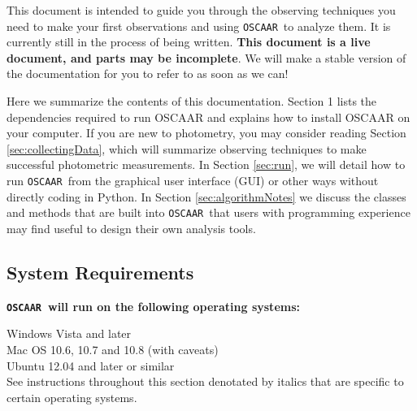 \documentclass[a4paper]{article}
\newcommand{\code}[1]{\texttt{#1}}
\newcommand{\oscaar}{\code{OSCAAR}~}
\begin{document}
This document is intended to guide you through the observing techniques you need to make your first observations and using \oscaar to analyze them. It is currently still in the process of being written. {\bf This document is a live document, and parts may be incomplete}. We will make a stable version of the documentation for you to refer to as soon as we can!

Here we summarize the contents of this documentation. Section 1 lists the dependencies required to run OSCAAR and explains how to install OSCAAR on your computer. If you are new to photometry, you may consider reading Section \ref{sec:collectingData}, which will summarize observing techniques to make successful photometric measurements. In Section \ref{sec:run}, we will detail how to run \oscaar from the graphical user interface (GUI) or other ways without directly coding in Python. In Section \ref{sec:algorithmNotes} we discuss the classes and methods that are built into \oscaar that users with programming experience may find useful to design their own analysis tools. 

\subsection{System Requirements} \label{sec:systemRequirements}

\textbf{\oscaar will run on the following operating systems:}

\indent Windows Vista and later \\
\indent Mac OS 10.6, 10.7 and 10.8 (with caveats) \\
\indent Ubuntu 12.04 and later or similar \\
See instructions throughout this section denotated by italics that are specific to certain operating systems.
\end{document}
